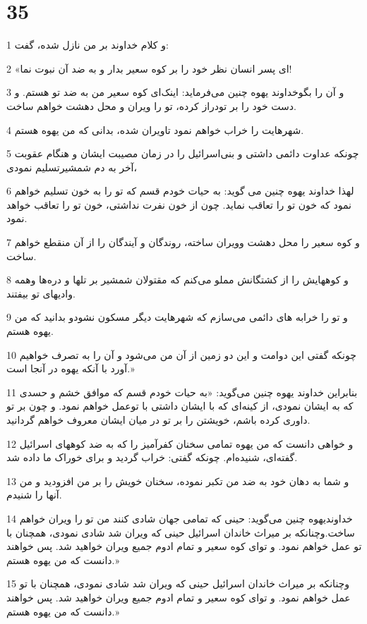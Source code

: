 \chapter{35}

\par 1 و کلام خداوند بر من نازل شده، گفت:
\par 2 «ای پسر انسان نظر خود را بر کوه سعیر بدار و به ضد آن نبوت نما!
\par 3 و آن را بگوخداوند یهوه چنین می‌فرماید: اینک‌ای کوه سعیر من به ضد تو هستم. و دست خود را بر تودراز کرده، تو را ویران و محل دهشت خواهم ساخت.
\par 4 شهرهایت را خراب خواهم نمود تاویران شده، بدانی که من یهوه هستم.
\par 5 چونکه عداوت دائمی داشتی و بنی‌اسرائیل را در زمان مصیبت ایشان و هنگام عقوبت آخر به دم شمشیرتسلیم نمودی،
\par 6 لهذا خداوند یهوه چنین می گوید: به حیات خودم قسم که تو را به خون تسلیم خواهم نمود که خون تو را تعاقب نماید. چون از خون نفرت نداشتی، خون تو را تعاقب خواهد نمود.
\par 7 و کوه سعیر را محل دهشت وویران ساخته، روندگان و آیندگان را از آن منقطع خواهم ساخت.
\par 8 و کوههایش را از کشتگانش مملو می‌کنم که مقتولان شمشیر بر تلها و دره‌ها وهمه وادیهای تو بیفتند.
\par 9 و تو را خرابه های دائمی می‌سازم که شهرهایت دیگر مسکون نشودو بدانید که من یهوه هستم.
\par 10 چونکه گفتی این دوامت و این دو زمین از آن من می‌شود و آن را به تصرف خواهیم آورد با آنکه یهوه در آنجا است.»
\par 11 بنابراین خداوند یهوه چنین می‌گوید: «به حیات خودم قسم که موافق خشم و حسدی که به ایشان نمودی، از کینه‌ای که با ایشان داشتی با توعمل خواهم نمود. و چون بر تو داوری کرده باشم، خویشتن را بر تو در میان ایشان معروف خواهم گردانید.
\par 12 و خواهی دانست که من یهوه تمامی سخنان کفرآمیز را که به ضد کوههای اسرائیل گفته‌ای، شنیده‌ام. چونکه گفتی: خراب گردید و برای خوراک ما داده شد.
\par 13 و شما به دهان خود به ضد من تکبر نموده، سخنان خویش را بر من افزودید و من آنها را شنیدم.
\par 14 خداوندیهوه چنین می‌گوید: حینی که تمامی جهان شادی کنند من تو را ویران خواهم ساخت.وچنانکه بر میراث خاندان اسرائیل حینی که ویران شد شادی نمودی، همچنان با تو عمل خواهم نمود. و تو‌ای کوه سعیر و تمام ادوم جمیع ویران خواهید شد. پس خواهند دانست که من یهوه هستم.»
\par 15 وچنانکه بر میراث خاندان اسرائیل حینی که ویران شد شادی نمودی، همچنان با تو عمل خواهم نمود. و تو‌ای کوه سعیر و تمام ادوم جمیع ویران خواهید شد. پس خواهند دانست که من یهوه هستم.»

